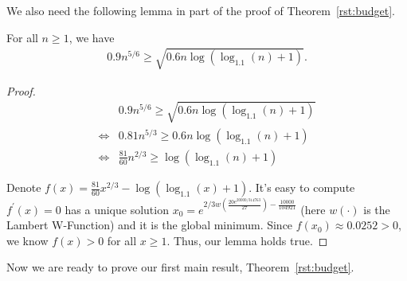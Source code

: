 \documentclass[twoside,11pt]{article}
\begin{document}
We also need the following lemma in part of the proof of Theorem~\ref{rst:budget}.
\begin{lemma}
For all $n\geq 1$, we have
\begin{align}
0.9n^{5/6} \geq \sqrt{0.6n \log(\log_{1.1}(n)+1)}. \nonumber
\end{align}
\label{lemma:cal2}
\end{lemma}
\begin{proof}
\begin{align}
&0.9n^{5/6} \geq \sqrt{0.6n \log(\log_{1.1}(n)+1)} \nonumber \\
\iff & 0.81 n^{5/3} \geq 0.6n \log(\log_{1.1}(n)+1) \nonumber \\
\iff &  \frac{81}{60} n^{2/3} \geq  \log(\log_{1.1}(n)+1) \nonumber
\end{align}

Denote $f(x) = \frac{81}{60}x^{2/3} - \log(\log_{1.1}(x)+1)$. It's easy to compute $f^{'}(x)=0$ has a unique solution $x_{0}=e^{2/3w(\frac{20e^{20000/314763}}{27})-\frac{10000}{104921}}$ (here $w(\cdot)$ is the Lambert W-Function) and it is the global minimum. Since $f(x_{0})\approx 0.0252 >0$, we know $f(x)>0$ for all $x\geq 1$. Thus, our lemma holds true.
\end{proof}


Now we are ready to prove our first main result, Theorem~\ref{rst:budget}.
\end{document}
